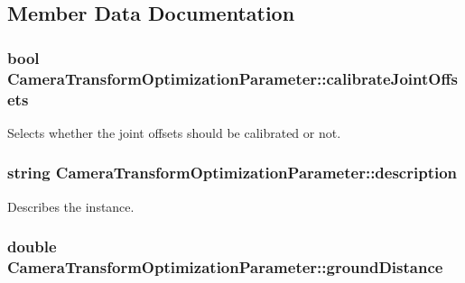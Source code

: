 \subsection{\-Member \-Data \-Documentation}
\hypertarget{classCameraTransformOptimizationParameter_a6ad5c2d68c9a05b28fd3e0ec0e1c68e0}{
\subsubsection[{calibrate\-Joint\-Offsets}]{\setlength{\rightskip}{0pt plus 5cm}bool {\bf \-Camera\-Transform\-Optimization\-Parameter\-::calibrate\-Joint\-Offsets}}}\label{classCameraTransformOptimizationParameter_a6ad5c2d68c9a05b28fd3e0ec0e1c68e0}
\-Selects whether the joint offsets should be calibrated or not. \hypertarget{classCameraTransformOptimizationParameter_ab90c93f4e267aeac97ea826455ab52b3}{
\subsubsection[{description}]{\setlength{\rightskip}{0pt plus 5cm}string {\bf \-Camera\-Transform\-Optimization\-Parameter\-::description}}}\label{classCameraTransformOptimizationParameter_ab90c93f4e267aeac97ea826455ab52b3}
\-Describes the instance. \hypertarget{classCameraTransformOptimizationParameter_ad081b0ee8bb11679267bcbd193724b0c}{
\subsubsection[{ground\-Distance}]{\setlength{\rightskip}{0pt plus 5cm}double {\bf \-Camera\-Transform\-Optimization\-Parameter\-::ground\-Distance}}}\label{classCameraTransformOptimizationParameter_ad081b0ee8bb11679267bcbd193724b0c}
